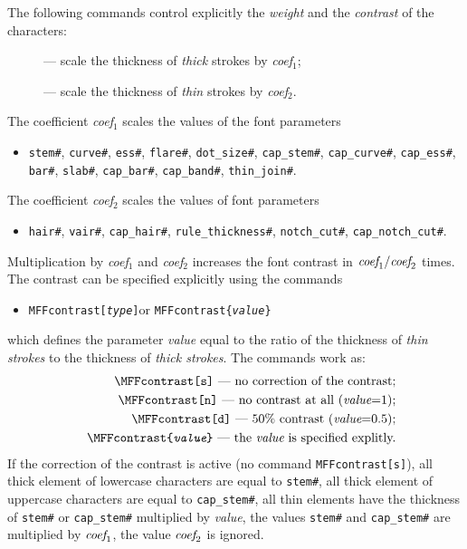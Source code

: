 The following commands control explicitly
the {\em weight} and the {\em contrast} of the characters:
\begin{description}
\item[]
--- scale the thickness of {\em thick} strokes by {\em coef}$_1$;
\item[]
--- scale the thickness of {\em thin} strokes by {\em coef}$_2$.
\end{description}
The coefficient {\em coef}$_1$ scales the values of the font parameters
\begin{itemize}
\item[]\begin{flushleft}
{\tt stem\#}, {\tt curve\#}, {\tt ess\#}, {\tt flare\#}, {\tt dot\_size\#},
{\tt cap\_stem\#}, {\tt cap\_curve\#}, {\tt cap\_ess\#},
{\tt bar\#}, {\tt slab\#}, {\tt cap\_bar\#}, {\tt cap\_band\#},
{\tt thin\_join\#}.
\end{flushleft}\end{itemize}
The coefficient {\em coef}$_2$ scales the values of font parameters
\begin{itemize}
\item[]\begin{flushleft}
{\tt hair\#}, {\tt vair\#}, {\tt cap\_hair\#},
{\tt rule\_thickness\#}, {\tt notch\_cut\#}, {\tt cap\_notch\_cut\#}.
\end{flushleft}\end{itemize}

Multiplication by {\em coef}$_1$ and {\em coef}$_2$ increases
the font contrast in $\hbox{\em coef}_1/\hbox{\em coef}_2$ times.
The contrast can be specified explicitly using the commands
\begin{itemize}
\item[]{\tt \bs{}MFFcontrast[{\em type}]}\qquad or \qquad
       {\tt \bs{}MFFcontrast\{{\em value}\}}
\end{itemize}
which defines the parameter {\em value} equal to the ratio
of the thickness of {\em thin strokes} to the thickness of
{\em thick strokes}. The commands work as:
\begin{eqnarray*}
&&\hbox{{\tt\bs{}MFFcontrast[s]} --- no correction of the contrast;}\\
&&\hbox{{\tt\bs{}MFFcontrast[n]} --- no contrast at all ({\em value}=1);}\\
&&\hbox{{\tt\bs{}MFFcontrast[d]} --- 50\% contrast ({\em value}=0.5);}\\
&&\hbox{{\tt\bs{}MFFcontrast\{{\em value}\}}
            --- the {\em value} is specified explitly.}
\end{eqnarray*}
If the correction of the contrast is active
(no command {\tt\bs{}MFFcontrast[s]}),
all thick element of lowercase characters are equal to {\tt stem\#},
all thick element of uppercase characters are equal to {\tt cap\_stem\#},
all thin elements have the thickness of {\tt stem\#} or {\tt cap\_stem\#}
multiplied by {\em value}, the values {\tt stem\#} and {\tt cap\_stem\#}
are multiplied by $\hbox{\em coef}_1$,
the value $\hbox{\em coef}_2$ is ignored.

